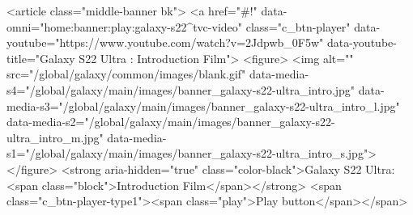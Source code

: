 {{{{{{{{{{{{{{{{{{{{{{{{{{{{{{{{{{{{{{{{{{{{{{{{{{{{{				<article class="middle-banner bk">
					<a href="#!" data-omni="home:banner:play:galaxy-s22^tvc-video" class="c_btn-player" data-youtube="https://www.youtube.com/watch?v=2Jdpwb_0F5w" data-youtube-title="Galaxy S22 Ultra : Introduction Film">
						<figure>
							<img alt="" src="/global/galaxy/common/images/blank.gif" 
								data-media-s4="/global/galaxy/main/images/banner_galaxy-s22-ultra_intro.jpg" 
								data-media-s3="/global/galaxy/main/images/banner_galaxy-s22-ultra_intro_l.jpg" 
								data-media-s2="/global/galaxy/main/images/banner_galaxy-s22-ultra_intro_m.jpg" 
								data-media-s1="/global/galaxy/main/images/banner_galaxy-s22-ultra_intro_s.jpg">
						</figure>
						<strong aria-hidden="true" class="color-black">Galaxy S22 Ultra: <span class="block">Introduction Film</span></strong>
						<span class="c_btn-player-type1"><span class="play">Play button</span></span>
}}}}}}}}}}}}}}}}}}}}}}}}}}}}}}}}}}}}}}}}}}}}}}}}}}}}}
